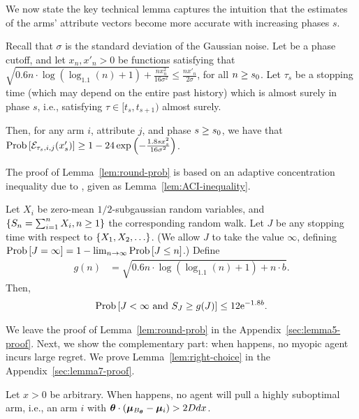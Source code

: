 We now state the key technical lemma captures the intuition that
the estimates of the arms' attribute vectors become
more accurate with increasing phases $s$.

\begin{lemma} \label{lem:round-prob}
Recall that $\sigma$ is the standard deviation of the Gaussian noise.
Let \LatePhase be a phase cutoff, 
and let $x_n, x'_n > 0$ be functions satisfying that
$\sqrt{0.6 n \cdot \log (\log_{1.1}(n) + 1) + \frac{n x_n^2}{16 \sigma^2}}
\leq \frac{n x'_n}{2 \sigma}$,
for all $n \geq s_0$.
Let $\tau_s$ be a stopping time
(which may depend on the entire past history)
which is almost surely in phase $s$,
i.e., satisfying $\tau \in [t_s, t_{s+1})$ almost surely.

Then, for any arm $i$, attribute $j$, and phase $s \geq s_0$,
we have that
$\Prob{\AccE{\tau_s}{i}{j}{x'_s}}
\geq 1 - 24 \exp\left(-\frac{1.8 s x_s^2}{16 \sigma^2} \right)$.
\end{lemma}

The proof of Lemma~\ref{lem:round-prob} is based on an adaptive
concentration inequality due to \cite{zhao2016adaptive},
given as Lemma~\ref{lem:ACI-inequality}.

\begin{lemma}
\label{lem:ACI-inequality}
Let $X_i$ be zero-mean $1/2$-subgaussian random variables,
and $\{ S_n = \sum_{i=1}^n X_i, n \geq 1 \}$ the corresponding random walk.
Let $J$ be any stopping time with respect to $\{ X_1, X_2, \ldots \}$.
(We allow $J$ to take the value $\infty$,
defining $\Prob{J = \infty} = 1 - \lim_{n \to \infty} \Prob{J \leq n}$.)
Define 
\begin{align*}
g(n) & = \sqrt{0.6 n \cdot \log (\log_{1.1}(n) + 1) + n \cdot b}.
\end{align*}
Then, 
\begin{align*}
\Prob{J < \infty \mbox{ and } S_J \geq g(J)} \leq 12 \e^{-1.8 b}.
\end{align*}
\end{lemma}

We leave the proof of Lemma~\ref{lem:round-prob} in the Appendix~\ref{sec:lemma5-proof}. Next, we show the complementary part:
when  happens, no myopic agent incurs large regret. We prove Lemma~\ref{lem:right-choice} in the Appendix~\ref{sec:lemma7-proof}.

\begin{lemma} \label{lem:right-choice}
Let $x > 0$ be arbitrary.
When  happens,
no agent \AgV will pull a highly suboptimal arm, i.e., an arm $i$ with 
$\bm{\theta} \cdot (\bm{\mu}_{B_{\bm{\theta}}} - \bm{\mu}_{i}) > 2D d x$.
\end{lemma}

